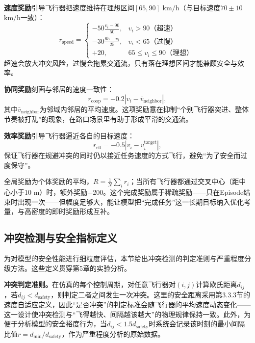 \documentclass[12pt,a4paper,UTF8]{ctexart}
\begin{document}
\textbf{速度奖励}引导飞行器把速度维持在理想区间$[65,90]$ $\mathrm{km/h}$（与目标速度$70\pm10$ $\mathrm{km/h}$一致）：
\begin{equation}
    r_{\text{speed}} = \begin{cases}
        -50\frac{v_i-90}{50}, & v_i>90 \text{（超速）}\\
        -30\frac{65-v_i}{25}, & v_i<65 \text{（过慢）}\\
        +20, & 65\leq v_i\leq 90 \text{（理想）}
    \end{cases}
    \label{eq:reward_speed}
\end{equation}
超速会放大冲突风险，过慢会拖累交通流，只有落在理想区间才能兼顾安全与效率。

\textbf{协同奖励}刻画与邻居的速度一致性：
\begin{equation}
    r_{\text{coop}} = -0.2\left|v_i - \bar{v}_{\text{neighbor}}\right|,
    \label{eq:reward_coop}
\end{equation}
其中$\bar{v}_{\text{neighbor}}$为邻域内邻居的平均速度。这项奖励意在抑制“个别飞行器突进、整体节奏被打乱”的现象，在路口场景里有助于形成平滑的交通流。

\textbf{效率奖励}引导飞行器逼近各自的目标速度：
\begin{equation}
    r_{\text{eff}} = -0.5\left|v_i - v_i^{\text{target}}\right|,
    \label{eq:reward_eff}
\end{equation}
保证飞行器在规避冲突的同时仍以接近任务速度的方式飞行，避免“为了安全而过度保守”。

全局奖励为个体奖励的平均，$R=\frac{1}{N}\sum_i r_i$；当所有飞行器都通过交叉中心（距中心小于10 m）时，额外奖励+200。这个完成奖励属于稀疏奖励——只在Episode结束时出现一次——但幅度足够大，能让模型把“完成任务”这一长期目标纳入优化考量，与高密度的即时奖励形成互补。

\subsection{冲突检测与安全指标定义}

为对模型的安全性能进行细粒度评估，本节给出冲突检测的判定准则与严重程度分级方法。这些定义贯穿第5章的实验分析。

\textbf{冲突判定准则。}在仿真的每个控制周期，对任意飞行器对$(i,j)$计算欧氏距离$d_{ij}$，若$d_{ij}<d_{\text{safety}}$，则判定二者之间发生一次冲突。这里的安全距离采用第3.3.3节的速度自适应定义，因此“是否冲突”的判定标准会随飞行器的平均速度动态变化——这一设计使冲突检测与“飞得越快、间隔越该越大”的物理规律保持一致。此外，为便于分析模型的安全裕度行为，当$d_{ij}<1.5d_{\text{safety}}$时系统会记录该时刻的最小间隔比值$r=d_{\min}/d_{\text{safety}}$，作为严重程度分析的原始数据。
\end{document}
